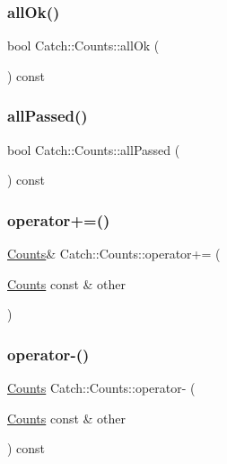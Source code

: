 \subsubsection{\texorpdfstring{all\+Ok()}{allOk()}}
{\footnotesize\ttfamily bool Catch\+::\+Counts\+::all\+Ok (\begin{DoxyParamCaption}{ }\end{DoxyParamCaption}) const}

\mbox{\label{structCatch_1_1Counts_a84999490e0ecaa3de5e121bf48eda1b3}} 
\subsubsection{\texorpdfstring{all\+Passed()}{allPassed()}}
{\footnotesize\ttfamily bool Catch\+::\+Counts\+::all\+Passed (\begin{DoxyParamCaption}{ }\end{DoxyParamCaption}) const}

\mbox{\label{structCatch_1_1Counts_a322a89475cd2cc039140ef371e973677}} 
\subsubsection{\texorpdfstring{operator+=()}{operator+=()}}
{\footnotesize\ttfamily \mbox{\hyperlink{structCatch_1_1Counts}{Counts}}\& Catch\+::\+Counts\+::operator+= (\begin{DoxyParamCaption}\item[{\mbox{\hyperlink{structCatch_1_1Counts}{Counts}} const \&}]{other }\end{DoxyParamCaption})}

\mbox{\label{structCatch_1_1Counts_aaa10666f559057e3e860d2a5a6fae4c4}} 
\subsubsection{\texorpdfstring{operator-\/()}{operator-()}}
{\footnotesize\ttfamily \mbox{\hyperlink{structCatch_1_1Counts}{Counts}} Catch\+::\+Counts\+::operator-\/ (\begin{DoxyParamCaption}\item[{\mbox{\hyperlink{structCatch_1_1Counts}{Counts}} const \&}]{other }\end{DoxyParamCaption}) const}

